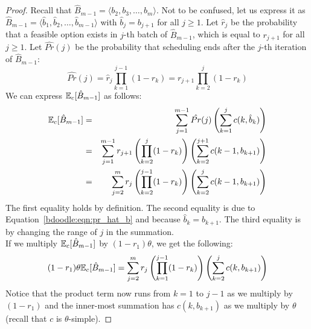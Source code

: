 \begin{proof}
	Recall that $\hat{B}_{m-1} = \langle b_2, b_3, \dots, b_{m} \rangle$.
	Not to be confused, let us express it as $\hat{B}_{m-1} = \langle \hat{b}_1, \hat{b}_2, \dots, \hat{b}_{m-1}\rangle$ with $\hat{b}_j = b_{j+1}$ for all $j\geq 1$. Let $\hat{r}_j$ be the probability that a feasible option exists in $j$-th batch of $\hat{B}_{m-1}$, which is equal to $r_{j+1}$ for all $j \geq 1$. Let $\hat{Pr}(j)$ be the probability that scheduling ends after the $j$-th iteration of $\hat{B}_{m-1}$:
	\begin{equation}
		\hat{Pr}(j)
		= \hat{r}_j \prod_{k=1}^{j-1} (1 - \hat{r}_k)
		= r_{j+1} \prod_{k=2}^{j} (1 - r_{k})  \label{bdoodle:eqn:pr_hat_b}
	\end{equation}
	We can express $\mathbb{E}_c[\hat{B}_{m-1}]$ as follows:
	\begin{eqnarray*}
	\mathbb{E}_c[\hat{B}_{m-1}]
	&=& \sum_{j=1}^{m-1} \hat{Pr}(j) \left( \sum_{k=1}^{j} c(k, \hat{b}_k) \right) \\
	&=& \sum_{j=1}^{m-1} r_{j+1} \left(\prod_{k=2}^{j} (1 - r_{k})\right) \left(\sum_{k=2}^{j+1} c(k-1, b_{k+1})\right) \\
	&=& \sum_{j=2}^{m} r_{j} \left(\prod_{k=2}^{j-1} (1 - r_{k})\right) \left(\sum_{k=2}^{j} c(k-1, b_{k+1})\right)
	\end{eqnarray*}
	The first equality holds by definition. The second equality is due to Equation~\ref{bdoodle:eqn:pr_hat_b} and because $\hat{b}_k = b_{k+1}$. The third equality is by changing the range of $j$ in the summation. \\

	If we multiply $\mathbb{E}_c[\hat{B}_{m-1}]$ by $(1 - r_1)\theta$, we get the following:
	\begin{equation} \label{bdoodle:eqn:ExpCost_Bhat}
	(1-r_1)\theta \mathbb{E}_c[\hat{B}_{m-1}] = \sum_{j=2}^{m} r_{j} \left(\prod_{k=1}^{j-1} (1 - r_{k})\right) \left(\sum_{k=2}^{j} c(k, b_{k+1})\right)
	\end{equation}
	Notice that the product term now runs from $k = 1$ to $j-1$ as we multiply by $(1-r_1)$ and the inner-most summation has $c(k, b_{k+1})$ as we multiply by $\theta$ (recall that $c$ is $\theta$-simple).


\end{proof}
